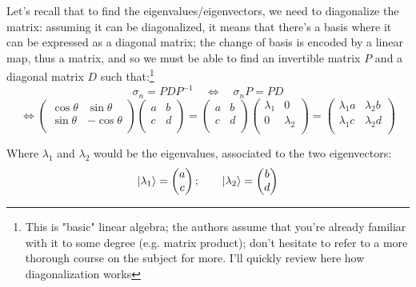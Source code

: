 \documentclass[solutions.tex]{subfiles}
\begin{document}
Let's recall that to find the eigenvalues/eigenvectors,
we need to diagonalize the matrix: assuming it can be diagonalized, it
means that there's a basis where it can be expressed as a diagonal matrix;
the change of basis is encoded by a linear map, thus a matrix, and so
we must be able to find an invertible matrix $P$ and a diagonal matrix
$D$ such that:\footnote{This is "basic" linear algebra; the authors assume
that you're already familiar with it to some degree (e.g. matrix product);
don't hesitate to refer to a more thorough course on the subject for more.
I'll quickly review here how diagonalization works}
\[
	\sigma_n = P D P^{-1}
	\quad\Leftrightarrow\quad
	\sigma_n P = PD
\]
\[
	\Leftrightarrow
	\begin{pmatrix}
		\cos\theta & \sin\theta \\
		\sin\theta & -\cos\theta \\
	\end{pmatrix}
	\begin{pmatrix}
		a & b \\
		c & d \\
	\end{pmatrix} =
	\begin{pmatrix}
		a & b \\
		c & d \\
	\end{pmatrix}
	\begin{pmatrix}
		\lambda_1 & 0         \\
		0         & \lambda_2 \\
	\end{pmatrix} = 	\begin{pmatrix}
		\lambda_1 a & \lambda_2 b \\
		\lambda_1 c & \lambda_2 d \\
	\end{pmatrix}
\]

Where $\lambda_1$ and $\lambda_2$ would be the eigenvalues, associated
to the two eigenvectors:
\[
	|\lambda_1\rangle = \begin{pmatrix}
		a \\
		c \\
	\end{pmatrix};\qquad
	|\lambda_2\rangle = \begin{pmatrix}
		b \\
		d \\
	\end{pmatrix}
\]
\end{document}
